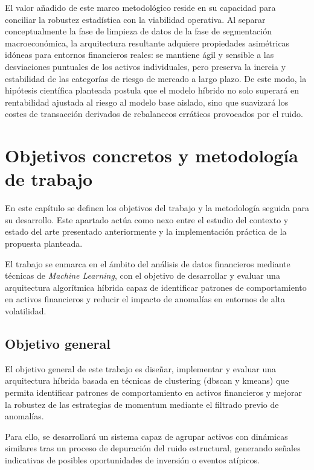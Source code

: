 \documentclass[
]{article}
\begin{document}
	El valor añadido de este marco metodológico reside en su capacidad para conciliar la robustez estadística con la viabilidad operativa. Al separar conceptualmente la fase de limpieza de datos de la fase de segmentación macroeconómica, la arquitectura resultante adquiere propiedades asimétricas idóneas para entornos financieros reales: se mantiene ágil y sensible a las desviaciones puntuales de los activos individuales, pero preserva la inercia y estabilidad de las categorías de riesgo de mercado a largo plazo. De este modo, la hipótesis científica planteada postula que el modelo híbrido no solo superará en rentabilidad ajustada al riesgo al modelo base aislado, sino que suavizará los costes de transacción derivados de rebalanceos erráticos provocados por el ruido.


\newpage
\section{Objetivos concretos y metodología de trabajo}
\label{metodologuxeda-del-trabajo}

En este capítulo se definen los objetivos del trabajo y la metodología
seguida para su desarrollo. Este apartado actúa como nexo entre el estudio
del contexto y estado del arte presentado anteriormente y la implementación
práctica de la propuesta planteada.

El trabajo se enmarca en el ámbito del análisis de datos financieros
mediante técnicas de \emph{Machine Learning}, con el objetivo de desarrollar
y evaluar una arquitectura algorítmica híbrida capaz de identificar patrones
de comportamiento en activos financieros y reducir el impacto de anomalías en
entornos de alta volatilidad.

\subsection{Objetivo general}

El objetivo general de este trabajo es diseñar, implementar y evaluar
una arquitectura híbrida basada en técnicas de \gls{clustering} (\gls{dbscan}
y \gls{kmeans}) que permita identificar patrones de comportamiento en activos
financieros y mejorar la robustez de las estrategias de \gls{momentum}
mediante el filtrado previo de anomalías.

Para ello, se desarrollará un sistema capaz de agrupar activos con
dinámicas similares tras un proceso de depuración del ruido estructural,
generando señales indicativas de posibles oportunidades de inversión o
eventos atípicos.
\end{document}
